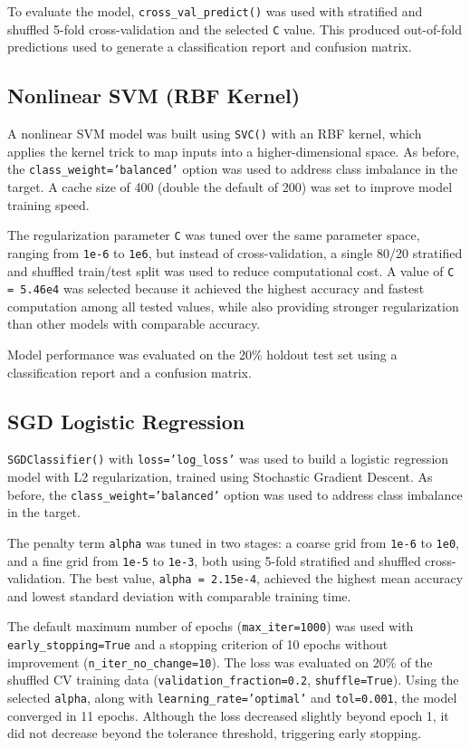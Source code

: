 \documentclass{article}      %
\begin{document}
To evaluate the model, \texttt{cross\_val\_predict()} was used with stratified and shuffled 5-fold cross-validation and the selected \texttt{C} value. This produced out-of-fold predictions used to generate a classification report and confusion matrix.

\subsection{Nonlinear SVM (RBF Kernel)}

A nonlinear SVM model was built using \texttt{SVC()} with an RBF kernel, which applies the kernel trick to map inputs into a higher-dimensional space. As before, the \texttt{class\_weight='balanced'} option was used to address class imbalance in the target. A cache size of 400 (double the default of 200) was set to improve model training speed.

The regularization parameter \texttt{C} was tuned over the same parameter space, ranging from \texttt{1e-6} to \texttt{1e6}, but instead of cross-validation, a single 80/20 stratified and shuffled train/test split was used to reduce computational cost. A value of \texttt{C = 5.46e4} was selected because it achieved the highest accuracy and fastest computation among all tested values, while also providing stronger regularization than other models with comparable accuracy.

Model performance was evaluated on the 20\% holdout test set using a classification report and a confusion matrix.

\subsection{SGD Logistic Regression}

\texttt{SGDClassifier()} with \texttt{loss='log\_loss'} was used to build a logistic regression model with L2 regularization, trained using Stochastic Gradient Descent. As before, the \texttt{class\_weight='balanced'} option was used to address class imbalance in the target.

The penalty term \texttt{alpha} was tuned in two stages: a coarse grid from \texttt{1e-6} to \texttt{1e0}, and a fine grid from \texttt{1e-5} to \texttt{1e-3}, both using 5-fold stratified and shuffled cross-validation. The best value, \texttt{alpha = 2.15e-4}, achieved the highest mean accuracy and lowest standard deviation with comparable training time.

The default maximum number of epochs (\texttt{max\_iter=1000}) was used with \texttt{early\_stopping=True} and a stopping criterion of 10 epochs without improvement (\texttt{n\_iter\_no\_change=10}). The loss was evaluated on 20\% of the shuffled CV training data (\texttt{validation\_fraction=0.2}, \texttt{shuffle=True}). Using the selected \texttt{alpha}, along with \texttt{learning\_rate='optimal'} and \texttt{tol=0.001}, the model converged in 11 epochs. Although the loss decreased slightly beyond epoch 1, it did not decrease beyond the tolerance threshold, triggering early stopping.
\end{document}
